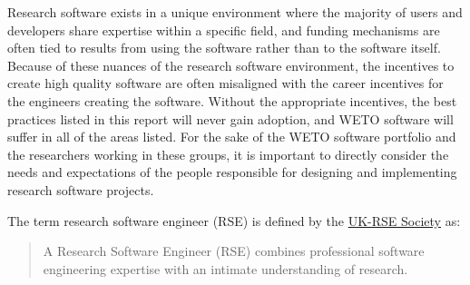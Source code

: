 \documentclass[]{nrel}
\begin{document}




\begin{appendices} %
    

    \label{app:A}

Research software exists in a unique environment where the majority of users and developers
share expertise within a specific field, and funding mechanisms are often tied to results
from using the software rather than to the software itself.
Because of these nuances of the research software environment, the incentives to create high
quality software are often misaligned with the career incentives for the engineers
creating the software.
Without the appropriate incentives, the best practices listed in this report will never gain
adoption, and WETO software will suffer in all of the areas listed.
For the sake of the WETO software portfolio and the researchers working in these groups,
it is important to directly consider the needs and expectations of the people
responsible for designing and implementing research software projects.

The term research software engineer (RSE) is defined by the
\href{https://society-rse.org/about/}{UK-RSE Society} as:

\begin{quote}
A Research Software Engineer (RSE) combines professional software engineering expertise with
an intimate understanding of research.
\end{quote}


\end{appendices}
\end{document}
